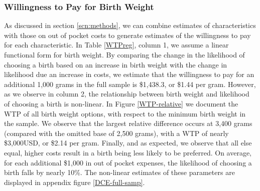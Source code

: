 \documentclass[a4paper, 11pt]{article}
\begin{document}
\begin{spacing}{1.4}
\subsubsection{Willingness to Pay for Birth Weight}
As discussed in section \ref{scn:methods}, we can combine estimates of
characteristics with those on out of pocket costs to generate estimates
of the willingness to pay for each characteristic.  In Table \ref{WTPreg}, column 1,
we assume a linear functional form for birth weight.  By comparing the change
in the likelihood of choosing a birth based on an increase in birth weight
with the change in likelihood due an increase in costs, we estimate that
the willingness to pay for an additional 1,000 grams in the full sample
is \$1,438.3, or \$1.44 per gram.  However, as we observe in column 2,
the relationship between birth weight and likelihood of choosing a birth
is non-linear.  In Figure \ref{WTP-relative} we document the WTP of all
birth weight options, with respect to the minimum birth weight in the
sample.  We observe that the largest relative difference occurs at 3,400
grams (compared with the omitted base of 2,500 grams), with a WTP of
nearly \$3,000USD, or \$2.14 per gram. Finally, and as expected, we observe that all else equal, higher costs result in
a birth being less likely to be preferred.  On average, for each additional \$1,000 in out of pocket expenses, the likelihood of choosing a birth falls by
nearly 10\%.  The non-linear estimates of these parameters are displayed in appendix figure \ref{DCE-full-samp}.




\end{spacing}
\end{document}
